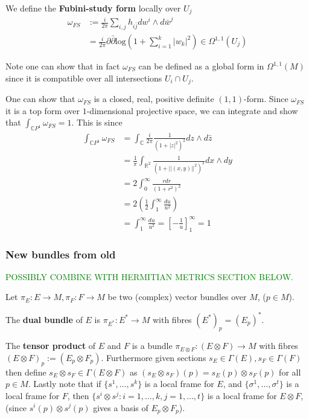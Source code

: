 \documentclass[a4paper]{article}
\theoremstyle{definition} \newtheorem*{definition}{Definition}
\theoremstyle{definition} \newtheorem*{definitions}{Definitions}
\theoremstyle{plain} \newtheorem{theorem}{Theorem}[section]
\theoremstyle{plain} \newtheorem{proposition}[theorem]{Proposition}
\theoremstyle{plain} \newtheorem{corollary}[theorem]{Corollary}
\theoremstyle{plain} \newtheorem{lemma}[theorem]{Lemma}
\theoremstyle{plain} \newtheorem{example}[theorem]{Example}
\newcommand{\finish}[1]{\textcolor{green}{#1}}
\newcommand{\defn}[1]{\textbf{#1}}
\newcommand{\realnos}{\mathbb{R}}
\newcommand{\complexnos}{\mathbb{C}}
\begin{document}
We define the \defn{Fubini-study form} locally over $U_j$
\begin{align*}
    \omega_{FS} & := \frac{i}{2\pi} \sum_{i, j} h_{i\bar{j}} dw^i \wedge d\bar{w}^j \\
 & = \frac{i}{2\pi} \partial \bar{\partial} \text{log} \left( 1 + \sum_{i=1}^k |w_k|^2  \right) \in \Omega^{1,1}(U_j)
\end{align*}


Note one can show that in fact $\omega_{FS}$ can be defined as a global form in $\Omega^{1,1}(M)$ since it is compatible over all intersections $U_i\cap U_j$. 

One can show that $\omega_{FS}$ is a closed, real, positive definite $(1,1)$-form. Since $\omega_{FS}$ it is a top form over $1$-dimensional projective space, we can integrate and show that $\int_{\complexnos P^1} \omega_{FS}=1$. This is since
\begin{align*}
  \int_{\complexnos P^1} \omega_{FS} & = \int_\complexnos \frac{i}{2\pi}\frac{1}{(1+|z|^2)^2}dz\wedge d\bar{z}\\
  & = \frac{1}{\pi}\int_{\realnos^2}\frac{1}{(1+||(x,y)||^2)^2}dx\wedge dy \\
  & = 2 \int_0^\infty \frac{rdr}{(1+r^2)^2} \\
  & = 2 \left( \frac{1}{2} \int_1^\infty \frac{du}{u^2 }\right) \\
  & = \int_1^\infty \frac{du}{u^2}  = \left[ - \frac{1}{u} \right]_1^\infty = 1
\end{align*}

\subsubsection{New bundles from old}
\finish{POSSIBLY COMBINE WITH HERMITIAN METRICS SECTION BELOW.}

Let $\pi_E:E\to M, \pi_F:F\to M$ be two (complex) vector bundles over $M$, ($p\in M$).

The \defn{dual bundle} of $E$ is $\pi_{E^\ast}:E^\ast \to M$ with fibres $(E^*)_p = (E_p)^*$.

The \defn{tensor product} of $E$ and $F$ is a bundle $\pi_{E\otimes F}:(E\otimes F) \to M$ with fibres $(E\otimes F)_p:=(E_p \otimes F_p)$. Furthermore given sections $s_E\in \Gamma(E), s_F\in \Gamma(F)$ then define $s_E\otimes s_F\in \Gamma(E\otimes F)$ as $(s_E\otimes s_F)(p)=s_E(p)\otimes s_F(p)$ for all $p\in M$. Lastly note that if $\{s^1, \ldots, s^k\}$ is a local frame for $E$, and $\{\sigma^1,\ldots , \sigma^t\}$ is a local frame for $F$, then $\{s^i\otimes s^j : i=1,\ldots, k, j=1,\ldots , t\}$ is a local frame for $E\otimes F$, (since $s^i(p)\otimes s^j(p)$ gives a basis of $E_p\otimes F_p$).  
\end{document}
